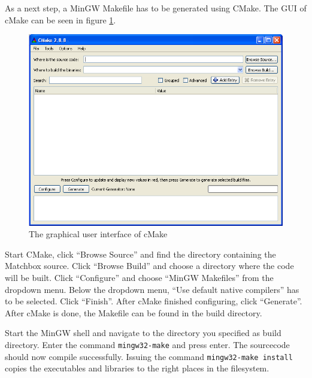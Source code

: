 As a next step, a MinGW Makefile has to be generated using CMake.
The GUI of cMake can be seen in figure \ref{fig:cmake}.
\begin{figure}[htpb]
	\centering
	\includegraphics[width=\textwidth]{img/cmakegui}
	\caption{The graphical user interface of cMake}
	\label{fig:cmake}
\end{figure}
Start CMake, click ``Browse Source'' and find the directory containing
the Matchbox source. Click ``Browse Build'' and choose a directory
where the code will be built.
Click ``Configure'' and choose ``MinGW Makefiles'' from the dropdown menu.
Below the dropdown menu, ``Use default native compilers'' has
to be selected. Click ``Finish''. 
After cMake finished configuring, click
``Generate''. After cMake is done, the Makefile can be found in the
build directory.

Start the MinGW shell and navigate to the directory you specified as
build directory. Enter the command \verb+mingw32-make+ and press enter.
The sourcecode should now compile successfully.
Issuing the command \verb+mingw32-make install+ copies the executables
and libraries to the right places in the filesystem.

